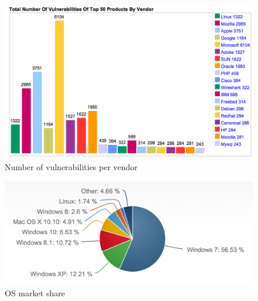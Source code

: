 \begin{figure}[h]
     \caption{Number of vulnerabilities per vendor~\cite{vul_ven}}
     \label{fig:vul_ven}
    \centering
    \includegraphics[width=\linewidth]{images/vul_ven}
\end{figure}

\begin{figure}[h]
     \caption{OS market share}
     \label{fig:os_pen}
    \centering
    \includegraphics[width=\linewidth]{images/os_pen}
\end{figure}


